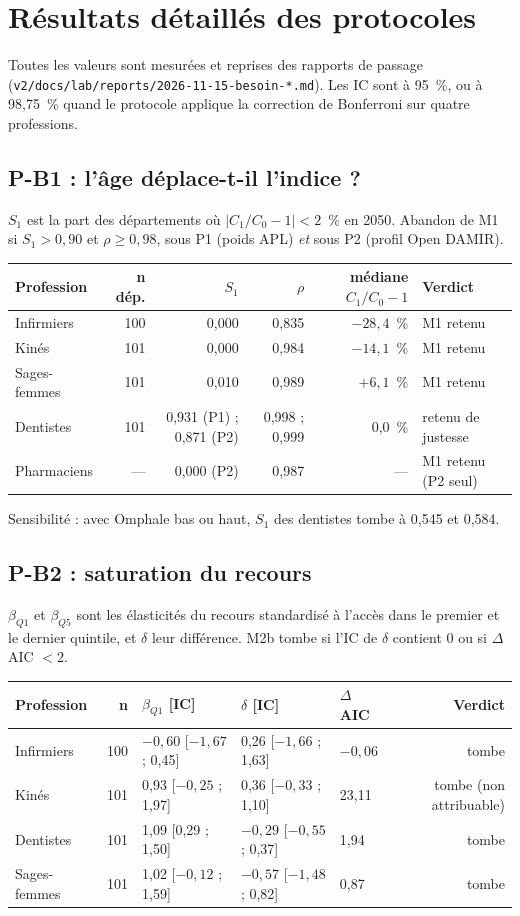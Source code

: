 \documentclass[11pt]{article}
\begin{document}
\clearpage
\appendix
\section{Résultats détaillés des protocoles}\label{ann:protocoles}
Toutes les valeurs sont mesurées et reprises des rapports de passage
(\texttt{v2/docs/lab/reports/2026-11-15-besoin-*.md}). Les IC sont à 95~\%, ou à 98,75~\% quand le protocole applique
la correction de Bonferroni sur quatre professions.

\subsection{P-B1 : l'âge déplace-t-il l'indice ?}
$S_1$ est la part des départements où $|C_1/C_0-1|<2$~\% en 2050. Abandon de M1 si $S_1>0{,}90$ et $\rho\ge0{,}98$,
sous P1 (poids APL) \emph{et} sous P2 (profil Open DAMIR).
\begin{center}\footnotesize
\begin{tabular}{@{}lrrrrl@{}}
\toprule
Profession & n dép. & $S_1$ & $\rho$ & médiane $C_1/C_0-1$ & Verdict \\
\midrule
Infirmiers & 100 & 0,000 & 0,835 & $-28{,}4$~\% & M1 retenu \\
Kinés & 101 & 0,000 & 0,984 & $-14{,}1$~\% & M1 retenu \\
Sages-femmes & 101 & 0,010 & 0,989 & $+6{,}1$~\% & M1 retenu \\
Dentistes & 101 & 0,931 (P1) ; 0,871 (P2) & 0,998 ; 0,999 & 0,0~\% & retenu de justesse \\
Pharmaciens & --- & 0,000 (P2) & 0,987 & --- & M1 retenu (P2 seul) \\
\bottomrule
\end{tabular}
\end{center}
Sensibilité : avec Omphale bas ou haut, $S_1$ des dentistes tombe à 0,545 et 0,584.

\subsection{P-B2 : saturation du recours}
$\beta_{Q1}$ et $\beta_{Q5}$ sont les élasticités du recours standardisé à l'accès dans le premier et le dernier
quintile, et $\delta$ leur différence. M2b tombe si l'IC de $\delta$ contient 0 ou si $\Delta$AIC $<2$.
\begin{center}\footnotesize
\begin{tabular}{@{}lrlllr@{}}
\toprule
Profession & n & $\beta_{Q1}$ [IC] & $\delta$ [IC] & $\Delta$AIC & Verdict \\
\midrule
Infirmiers & 100 & $-0{,}60$ [$-1{,}67$ ; 0,45] & 0,26 [$-1{,}66$ ; 1,63] & $-0{,}06$ & tombe \\
Kinés & 101 & 0,93 [$-0{,}25$ ; 1,97] & 0,36 [$-0{,}33$ ; 1,10] & 23,11 & tombe (non attribuable) \\
Dentistes & 101 & 1,09 [0,29 ; 1,50] & $-0{,}29$ [$-0{,}55$ ; 0,37] & 1,94 & tombe \\
Sages-femmes & 101 & 1,02 [$-0{,}12$ ; 1,59] & $-0{,}57$ [$-1{,}48$ ; 0,82] & 0,87 & tombe \\
\bottomrule
\end{tabular}
\end{center}
\end{document}
